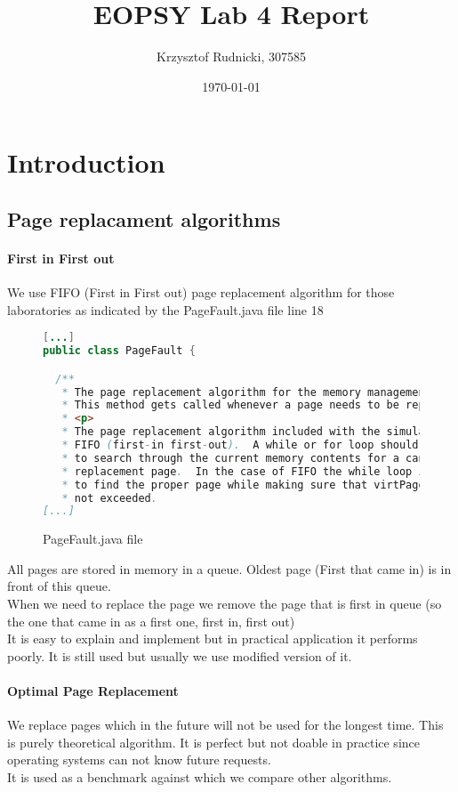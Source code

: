 \documentclass{article}
\begin{document}
\title{EOPSY Lab 4 Report}
\author{Krzysztof Rudnicki, 307585}
\date{\today}
\maketitle
\section{Introduction}
\subsection{Page replacament algorithms}
\paragraph{First in First out}
We use FIFO (First in First out) page replacement algorithm for those laboratories as indicated
by the PageFault.java file line 18
\begin{figure}[H]
\caption{PageFault.java file}
\begin{lstlisting}[language=Java]
[...]
public class PageFault {

  /**
   * The page replacement algorithm for the memory management sumulator.
   * This method gets called whenever a page needs to be replaced.
   * <p>
   * The page replacement algorithm included with the simulator is 
   * FIFO (first-in first-out).  A while or for loop should be used 
   * to search through the current memory contents for a canidate 
   * replacement page.  In the case of FIFO the while loop is used 
   * to find the proper page while making sure that virtPageNum is 
   * not exceeded.
[...]
\end{lstlisting}
\end{figure}
All pages are stored in memory in a queue. Oldest page (First that came in) is
in front of this queue. \\ When we need to replace the page we remove the page that
is first in queue (so the one that came in as a first one, first in, first out)
\\
It is easy to explain and implement but in practical application it performs
poorly. It is still used but usually we use modified version of it.
\cite{Page Replacement Algorithms}
\paragraph{Optimal Page Replacement}
We replace pages which in the future will not be used for the longest time.
This is purely theoretical algorithm. It is perfect but not doable in practice
since operating systems can not know future requests. \\
It is used as a benchmark against which we compare other algorithms. 
\cite{Page Replacament Algorithms}
\end{document}

